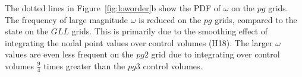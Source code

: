 The dotted lines in Figure~\ref{fig:loworder}b show the PDF of $\omega$ on the $pg$ grids. The frequency of large magnitude $\omega$ is reduced on the $pg$ grids, compared to the state on the $GLL$ grids. This is primarily due to the smoothing effect of integrating the nodal point values over control volumes (H18). The larger $\omega$ values are even less frequent on the $pg2$ grid due to integrating over control volumes $\frac{9}{4}$ times greater than the $pg3$ control volumes. 

